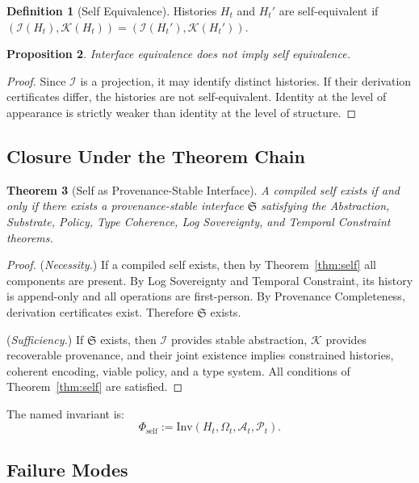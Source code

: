 \documentclass[12pt, a4paper]{article}
\theoremstyle{plain}
\newtheorem{theorem}{Theorem}[section]
\newtheorem{proposition}[theorem]{Proposition}
\theoremstyle{definition}
\newtheorem{definition}[theorem]{Definition}
\theoremstyle{remark}
\begin{document}
\begin{definition}[Self Equivalence]
Histories $H_t$ and $H_t'$ are self-equivalent if $(\mathcal{I}(H_t), \mathcal{K}(H_t)) = (\mathcal{I}(H_t'), \mathcal{K}(H_t'))$.
\end{definition}

\begin{proposition}
Interface equivalence does not imply self equivalence.
\end{proposition}

\begin{proof}
Since $\mathcal{I}$ is a projection, it may identify distinct histories. If their derivation certificates differ, the histories are not self-equivalent. Identity at the level of appearance is strictly weaker than identity at the level of structure.
\end{proof}

\subsection{Closure Under the Theorem Chain}

\begin{theorem}[Self as Provenance-Stable Interface]
\label{thm:psi}
A compiled self exists if and only if there exists a provenance-stable interface $\mathfrak{S}$ satisfying the Abstraction, Substrate, Policy, Type Coherence, Log Sovereignty, and Temporal Constraint theorems.
\end{theorem}

\begin{proof}
(\textit{Necessity.}) If a compiled self exists, then by Theorem~\ref{thm:self} all components are present. By Log Sovereignty and Temporal Constraint, its history is append-only and all operations are first-person. By Provenance Completeness, derivation certificates exist. Therefore $\mathfrak{S}$ exists.

(\textit{Sufficiency.}) If $\mathfrak{S}$ exists, then $\mathcal{I}$ provides stable abstraction, $\mathcal{K}$ provides recoverable provenance, and their joint existence implies constrained histories, coherent encoding, viable policy, and a type system. All conditions of Theorem~\ref{thm:self} are satisfied.
\end{proof}

The named invariant is:
\[
\Phi_{\mathrm{self}} := \mathrm{Inv}(H_t, \Omega_t, \mathcal{A}_t, \mathcal{P}_t).
\]

\subsection{Failure Modes}
\end{document}
